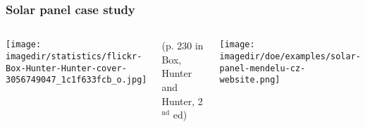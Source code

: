 \begin{frame}\frametitle{Solar panel case study}
	
	\begin{columns}[T]
			\texttt{[image: \\imagedir/statistics/flickr-Box-Hunter-Hunter-cover-3056749047\_1c1f633fcb\_o.jpg]}
			
			{\scriptsize (p. 230 in Box, Hunter and Hunter, 2$^\text{nd}$ ed)}
			
			\texttt{[image: \\imagedir/doe/examples/solar-panel-mendelu-cz-website.png]}
			
			
	\end{columns}
\end{frame}

